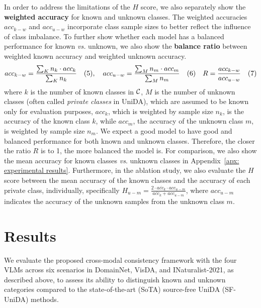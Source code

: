 \documentclass[10pt]{article} %
\begin{document}
In order to address the limitations of the $H$ score, we also separately show the \textbf{weighted accuracy} for known and unknown classes.
The weighted accuracies $acc_{k-w}$ and $acc_{u-w}$ incorporate class sample sizes to better reflect the influence of class imbalance.
To further show whether each model has a balanced performance for known {\em vs.} unknown, we also show the \textbf{balance ratio} between weighted known accuracy and weighted unknown accuracy.
%
\begin{equation*}
    acc_{k-w} = \frac{\sum_K n_k \cdot acc_k}{\sum_K n_k} \quad(5) ,  \quad acc_{u-w} = \frac{\sum_M n_m \cdot acc_m}{\sum_M n_m} \quad (6)  \quad R = \frac{acc_{k-w}}{acc_{u-w}} \quad (7)\\ 
\end{equation*}
% 
where $k$ is the number of known classes in ${\cal C}$, $M$ is the number of unknown classes (often called {\em private classes} in UniDA), which are assumed to be known only for evaluation purposes, $acc_k$, which is weighted by sample size $n_k$, is the accuracy of the known class $k$, while $acc_m$, the accuracy of the unknown class $m$, is weighted by sample size $n_m$.
We expect a good model to have good and balanced performance for both known and unknown classes.
Therefore, the closer the ratio $R$ is to 1, the more balanced the model is.
For comparison, we also show the mean accuracy for known classes {\em vs}. unknown classes in Appendix~\ref{apx: experimental results}.
Furthermore, in the ablation study, we also evaluate the $H$ score between the mean accuracy of the known classes and the accuracy of each private class, individually, specifically $H_{u-m} = \frac{2 \cdot \overline{acc_k} \cdot acc_{u-m}}{\overline{acc_k} + acc_{u-m}}$, where $acc_{u-m}$ indicates the accuracy of the unknown samples from the unknown class $m$.
\vspace{-2mm}
\section{Results}\label{results}
We evaluate the proposed cross-modal consistency framework with the four VLMs across six scenarios in DomainNet, VisDA, and INaturalist-2021, as described above, to assess its ability to distinguish known and unknown categories compared to the state-of-the-art (SoTA) source-free UniDA (SF-UniDA) methods.
\end{document}
